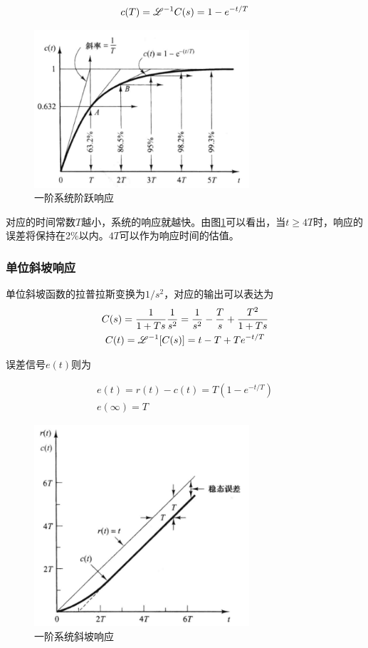 \begin{equation*}
c(T)=\mathscr{L}^{-1}C(s)=1-e^{-{t}/{T}}
\end{equation*}

\begin{figure}[!ht]
	\centering
	\includegraphics[width=8cm]{figures/6.png}
	\caption{一阶系统阶跃响应}
	\label{6}
\end{figure}

对应的时间常数$T$越小，系统的响应就越快。由图\ref{6}可以看出，当$t\ge4T$时，响应的误差将保持在2\%以内。$4T$可以作为响应时间的估值。

\subsubsection{单位斜坡响应}

单位斜坡函数的拉普拉斯变换为$1/s^2$，对应的输出可以表达为
\begin{gather*}
C(s)=\frac{1}{1+Ts}\frac{1}{s^2}=\frac{1}{s^2}-\frac{T}{s}+\frac{T^2}{1+Ts}\\
C(t)=\mathscr{L}^{-1}[C(s)]=t-T+Te^{-t/T}
\end{gather*}

误差信号$e(t)$则为

\begin{gather*}
e(t)=r(t)-c(t)=T(1-e^{-t/T})\\
e(\infty)=T
\end{gather*}

\begin{figure}[!ht]
	\centering
	\includegraphics[width=8cm]{figures/7.png}
	\caption{一阶系统斜坡响应}
	\label{7}
\end{figure}

